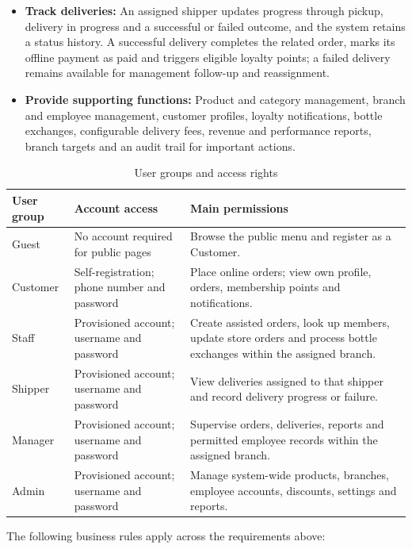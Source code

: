\begin{itemize}
  \item \textbf{Track deliveries:} An assigned shipper updates progress through pickup, delivery in progress and a successful or failed outcome, and the system retains a status history. A successful delivery completes the related order, marks its offline payment as paid and triggers eligible loyalty points; a failed delivery remains available for management follow-up and reassignment.
  \item \textbf{Provide supporting functions:} Product and category management, branch and employee management, customer profiles, loyalty notifications, bottle exchanges, configurable delivery fees, revenue and performance reports, branch targets and an audit trail for important actions.
\end{itemize}

\begin{table}[H]
  \centering
  \caption{User groups and access rights}
  \label{tab:user-groups}
  \begin{tabularx}{\textwidth}{|L{2.0cm}|L{4.6cm}|Y|}
    \hline
    \textbf{User group} & \textbf{Account access} & \textbf{Main permissions} \\ \hline
    Guest & No account required for public pages & Browse the public menu and register as a Customer. \\ \hline
    Customer & Self-registration; phone number and password & Place online orders; view own profile, orders, membership points and notifications. \\ \hline
    Staff & Provisioned account; username and password & Create assisted orders, look up members, update store orders and process bottle exchanges within the assigned branch. \\ \hline
    Shipper & Provisioned account; username and password & View deliveries assigned to that shipper and record delivery progress or failure. \\ \hline
    Manager & Provisioned account; username and password & Supervise orders, deliveries, reports and permitted employee records within the assigned branch. \\ \hline
    Admin & Provisioned account; username and password & Manage system-wide products, branches, employee accounts, discounts, settings and reports. \\ \hline
  \end{tabularx}
\end{table}

The following business rules apply across the requirements above:

